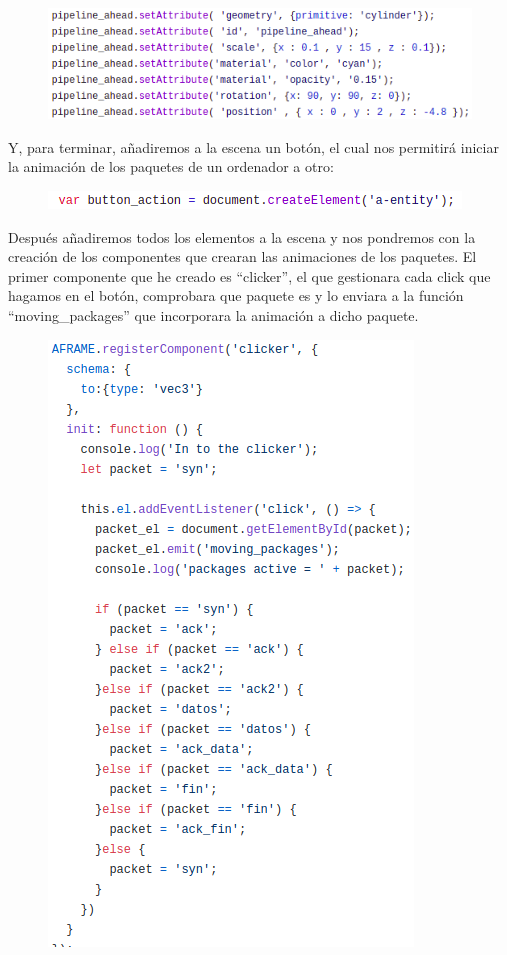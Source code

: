 \documentclass[a4paper, 12pt]{book}
\begin{document}
\begin{figure}[h]
\centering
    \includegraphics[scale=0.8]{img/paso2_bbb.png}
\end{figure}


Y, para terminar, añadiremos a la escena un botón, el cual nos permitirá iniciar la animación de los paquetes de un ordenador a otro:

\begin{figure}[h]
\centering
    \includegraphics[scale=0.8]{img/boton.png}
\end{figure}

Después añadiremos todos los elementos a la escena y nos pondremos con la creación de los componentes que crearan las animaciones de los paquetes.
El primer componente que he creado es “clicker”, el que gestionara cada click que hagamos en el botón, comprobara que paquete es y lo enviara a la función “moving\_packages” que incorporara la animación a dicho paquete.

\begin{figure}[h]
\centering
    \includegraphics[scale=0.54]{img/clicker.png}
\end{figure}
\end{document}
